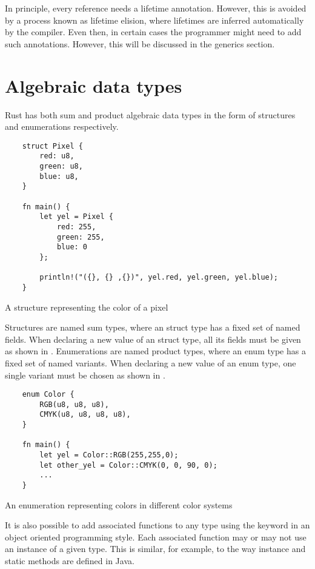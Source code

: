 In principle, every reference needs a lifetime annotation. However, this is
avoided by a process known as lifetime elision, where lifetimes are inferred
automatically by the compiler. Even then, in certain cases the programmer might
need to add such annotations. However, this will be discussed in the generics
section.

\section{Algebraic data types}

Rust has both sum and product algebraic data types in the form of structures and
enumerations respectively.

\begin{listing}[H]
	\begin{verbatim}
    struct Pixel {
        red: u8,
        green: u8,
        blue: u8,
    }

    fn main() {
        let yel = Pixel {
            red: 255,
            green: 255,
            blue: 0
        };

        println!("({}, {} ,{})", yel.red, yel.green, yel.blue);
    }
    \end{verbatim}
  \caption{A structure representing the color of a pixel}
  \label{lst:struct}
\end{listing}

Structures are named sum types, where an struct type has a fixed set of named
fields. When declaring a new value of an struct type, all its fields must be
given as shown in . Enumerations are named product types, where
an enum type has a fixed set of named variants. When declaring a new value of an
enum type, one single variant must be chosen as shown in .

\begin{listing}[h]
	\begin{verbatim}
    enum Color {
        RGB(u8, u8, u8),
        CMYK(u8, u8, u8, u8),
    }

    fn main() {
        let yel = Color::RGB(255,255,0);
        let other_yel = Color::CMYK(0, 0, 90, 0);
        ...
    }
    \end{verbatim}
  \caption{An enumeration representing colors in different color systems}
  \label{lst:enum}
\end{listing}

It is also possible to add associated functions to any type using the
 keyword in an object oriented programming style. Each associated
function may or may not use an instance of a given type. This is similar,
for example, to the way instance and static methods are defined in Java.

